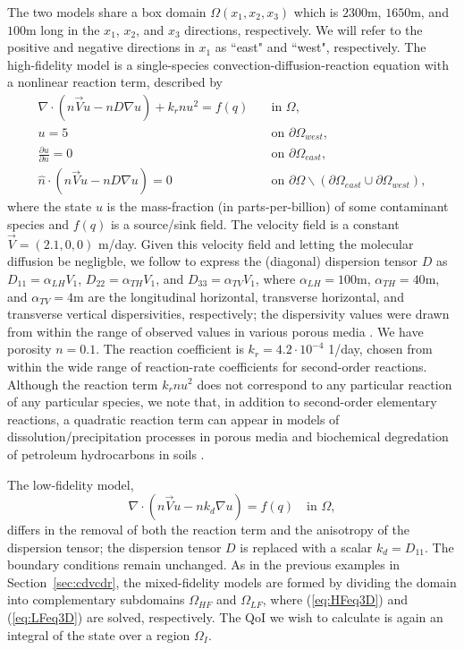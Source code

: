The two models share a box domain $\Omega(x_1,x_2,x_3)$ which is $2300$m, $1650$m, and $100$m long in the $x_1$, $x_2$, and $x_3$ directions, respectively. We will refer to the positive and negative directions in $x_1$ as ``east" and ``west", respectively. The high-fidelity model is a single-species convection-diffusion-reaction equation with a nonlinear reaction term, described by
%
\begin{subequations}
\label{eq:cdvcdrHF3D}
\begin{align}
\nabla\cdot(n\vec{V}u - nD\nabla u) + k_rnu^2 = f(q) \quad &\text{in } \Omega, \label{eq:HFeq3D}\\
u = 5 \quad &\text{on } \partial \Omega_{west}, \\
\frac{\partial u}{\partial n} = 0 \quad &\text{on }\partial\Omega_{east}, \\
\hat{n}\cdot(n\vec{V}u - nD\nabla u) = 0 \quad &\text{on }\partial\Omega\backslash(\partial\Omega_{east}\cup\partial\Omega_{west}),
\end{align} 
\end{subequations}
%
where the state $u$ is the mass-fraction (in parts-per-billion) of some contaminant species and $f(q)$ is a source/sink field. The velocity field is a constant $\vec{V}=(2.1,0,0)$ m/day. Given this velocity field and letting the molecular diffusion be negligble, we follow \cite{Vestedetal93} to express the (diagonal) dispersion tensor $D$ as $D_{11}=\alpha_{LH}V_1$, $D_{22}=\alpha_{TH}V_1$, and $D_{33}=\alpha_{TV}V_1$, where $\alpha_{LH}=100$m, $\alpha_{TH}=40$m, and $\alpha_{TV}=4$m are the longitudinal horizontal, transverse horizontal, and transverse vertical dispersivities, respectively; the dispersivity values were drawn from within the range of observed values in various porous media \cite{Davis86}. We have porosity $n=0.1$. The reaction coefficient is $k_r=4.2\cdot10^{-4}$ 1/day, chosen from within the wide range of reaction-rate coefficients for second-order reactions. Although the reaction term $k_rnu^2$ does not correspond to any particular reaction of any particular species, we note that, in addition to second-order elementary reactions, a quadratic reaction term can appear in models of dissolution/precipitation processes in porous media \cite{Aha97} and biochemical degredation of petroleum hydrocarbons in soils \cite{Jack94}.

The low-fidelity model,
%
\begin{equation}
\nabla\cdot(n\vec{V}u - nk_d\nabla u) = f(q) \quad \text{in } \Omega, \label{eq:LFeq3D}
\end{equation}
%
differs in the removal of both the reaction term and the anisotropy of the dispersion tensor; the dispersion tensor $D$ is replaced with a scalar $k_d=D_{11}$. The boundary conditions remain unchanged. As in the previous examples in Section~\ref{sec:cdvcdr}, the mixed-fidelity models are formed by dividing the domain into complementary subdomains $\Omega_{HF}$ and $\Omega_{LF}$, where (\ref{eq:HFeq3D}) and (\ref{eq:LFeq3D}) are solved, respectively. The QoI we wish to calculate is again an integral of the state over a region $\Omega_I$. 


